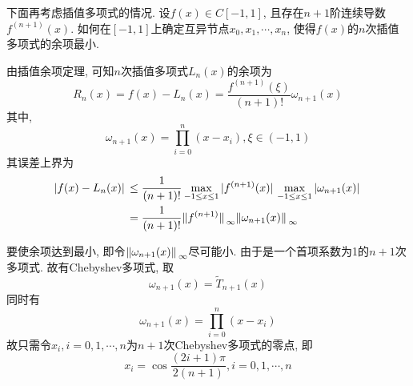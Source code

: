 下面再考虑插值多项式的情况. 设$f(x)\in C[-1,1]$, 且存在$n+1$阶连续导数$f^{(n+1)}(x)$. 如何在$[-1,1]$上确定互异节点$x_0,x_1,\cdots,x_n$, 使得$f(x)$的$n$次插值多项式的余项最小.

由插值余项定理, 可知$n$次插值多项式$L_n(x)$的余项为
\begin{equation*}
    R_n(x)=f(x)-L_n(x)=\frac{f^{(n+1)}(\xi)}{(n+1)!}\omega_{n+1}(x)
\end{equation*}
其中, 
\begin{equation*}
    \omega_{n+1}(x)=\prod_{i=0}^n(x-x_i), \xi\in(-1,1)
\end{equation*}
其误差上界为
\begin{align*}
    \abs*{f(x)-L_n(x)}&\le\frac{1}{(n+1)!}\max_{-1\le x\le1}\abs*{f^{(n+1)}(x)}\max_{-1\le x\le1}\abs*{\omega_{n+1}(x)}\\
    &=\frac{1}{(n+1)!}\norm*{f^{(n+1)}}_\infty\norm*{\omega_{n+1}(x)}_\infty
\end{align*}

要使余项达到最小, 即令$\norm*{\omega_{n+1}(x)}_\infty$尽可能小. 由于是一个首项系数为1的$n+1$次多项式. 故有Chebyshev多项式, 取
\begin{equation*}
    \omega_{n+1}(x)=\widetilde{T}_{n+1}(x)
\end{equation*}
同时有
\begin{equation*}
    \omega_{n+1}(x)=\prod_{i=0}^n(x-x_i)
\end{equation*}
故只需令$x_i,i=0,1,\cdots,n$为$n+1$次Chebyshev多项式的零点, 即
\begin{equation*}
    x_i=\cos\frac{(2i+1)\pi}{2(n+1)}, i=0,1,\cdots,n
\end{equation*}